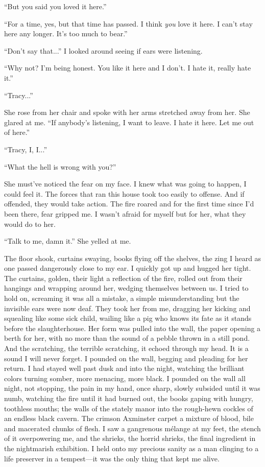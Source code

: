 ``But you said you loved it here.''

``For a time, yes, but that time has passed. I think \emph{you} love it
here. I can't stay here any longer. It's too much to bear.''

``Don't say that...'' I looked around seeing if ears were listening.

``Why not? I'm being honest. You like it here and I don't. I hate it,
really hate it.''

``Tracy...''

She rose from her chair and spoke with her arms stretched away from her.
She glared at me. ``If anybody's listening, I want to leave. I hate it
here. Let me out of here.''

``Tracy, I, I...''

``What the hell is wrong with you?''

She must've noticed the fear on my face. I knew what was going to
happen, I could feel it. The forces that ran this house took too easily
to offense. And if offended, they would take action. The fire roared and
for the first time since I'd been there, fear gripped me. I wasn't
afraid for myself but for her, what they would do to her.

``Talk to me, damn it.'' She yelled at me.

The floor shook, curtains swaying, books flying off the shelves, the
zing I heard as one passed dangerously close to my ear. I quickly got up
and hugged her tight. The curtains, golden, their light a reflection of
the fire, rolled out from their hangings and wrapping around her,
wedging themselves between us. I tried to hold on, screaming it was all
a mistake, a simple misunderstanding but the invisible ears were now
deaf. They took her from me, dragging her kicking and squealing like
some sick child, wailing like a pig who knows its fate as it stands
before the slaughterhouse. Her form was pulled into the wall, the paper
opening a berth for her, with no more than the sound of a pebble thrown
in a still pond. And the scratching, the terrible scratching, it echoed
through my head. It is a sound I will never forget. I pounded on the
wall, begging and pleading for her return. I had stayed well past dusk
and into the night, watching the brilliant colors turning somber, more
menacing, more black. I pounded on the wall all night, not stopping, the
pain in my hand, once sharp, slowly subsided until it was numb, watching
the fire until it had burned out, the books gaping with hungry,
toothless mouths; the walls of the stately manor into the rough-hewn
cockles of an endless black cavern. The crimson Axminster carpet a
mixture of blood, bile and macerated chunks of flesh. I saw a gangrenous
mélange at my feet, the stench of it overpowering me, and the shrieks,
the horrid shrieks, the final ingredient in the nightmarish exhibition.
I held onto my precious sanity as a man clinging to a life preserver in
a tempest---it was the only thing that kept me alive.

